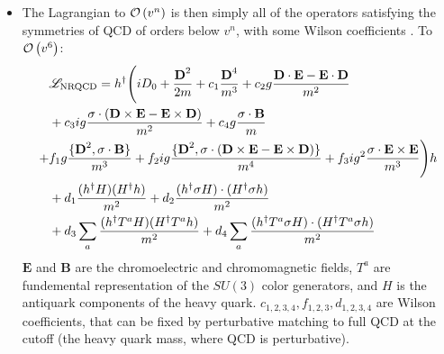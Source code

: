 \begin{itemize}
\item
  The Lagrangian to $\mathcal{O}\left( v^n \right)$ is then simply all of the operators satisfying the symmetries of QCD of orders below $v^n$, with some Wilson coefficients \cite{Lepage:1992tx}. To $\mathcal{O}\left( v^6 \right)$:
  \begin{align}
    \nonumber
    &\mathscr{L}_{\text{NRQCD}} = h^{\dagger} \Bigg( i D_0 + {{\textbf{D}}^2 \over 2m} + c_1 {{\textbf{D}}^4\over m^3}
    + c_2 g{{\textbf{D}}\cdot {\textbf{E}} - {\textbf{E}} \cdot {\textbf{D}} \over m^2} \\
    \nonumber
    &+ c_3 ig{ {\bf{\sigma}}\cdot ({\textbf{D}}\times {\textbf{E}} - {\textbf{E}}\times {\textbf{D}})\over m^2}
    + c_4 g{ {\bf{\sigma}}\cdot {\textbf{B}}\over m} \\
    + \nonumber
    & f_1 g{\{{\textbf{D}}^2,{\bf{\sigma}}\cdot {\textbf{B}}\}\over m^3 }
    + f_2 ig{\{ {\textbf{D}}^2,{\bf{\sigma}}\cdot ( {\textbf{D}}\times {\textbf{E}} - {\textbf{E}}\times {\textbf{D}})\}\over m^4 }
    + f_3 ig^2 {{\bf{\sigma}}\cdot {\textbf{E}}\times {\textbf{E}}\over m^3}  \Bigg)h \\
    \nonumber
    &+ d_1 { (h^{\dagger} H) (H^{\dagger} h) \over m^2} + d_2 { (h^{\dagger} {\bf{\sigma}} H) \cdot  (H^{\dagger}{\bf{\sigma}} h) \over m^2} \\
    &+ d_3 \sum_a {(h^{\dagger} T^a H) (H^{\dagger} T^a h) \over m^2} + d_4 \sum_a {(h^{\dagger} T^a {\bf{\sigma}} H) \cdot (H^{\dagger} T^a {\bf{\sigma}} h) \over m^2}
  \end{align}
  ${\textbf{E}}$ and ${\textbf{B}}$ are the chromoelectric and chromomagnetic fields, $T^a$ are fundemental representation of the $SU(3)$ color generators, and $H$ is the antiquark components of the heavy quark. $c_{1,2,3,4},f_{1,2,3},d_{1,2,3,4}$ are Wilson coefficients, that can be fixed by perturbative matching to full QCD at the cutoff (the heavy quark mass, where QCD is perturbative).

\end{itemize}
